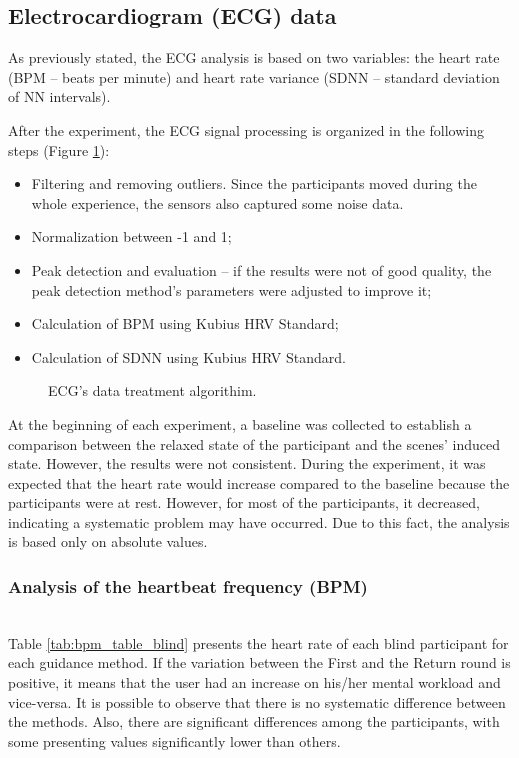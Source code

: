 \subsection*{Electrocardiogram (ECG) data}
\label{subsubsec:results_ecg_1}

As previously stated, the ECG analysis is based on two variables: the heart rate (BPM – beats per minute) and heart rate variance (SDNN – standard deviation of NN intervals). 

After the experiment, the ECG signal processing is organized in the following steps (Figure \ref{fig:ecg_algorithim}): 

\begin{itemize}
    \item Filtering and removing outliers. Since the participants moved during the whole experience, the sensors also captured some noise data.
    \item Normalization between -1 and 1;
    \item Peak detection and evaluation – if the results were not of good quality, the peak detection method's parameters were adjusted to improve it; 
    \item Calculation of BPM using Kubius HRV Standard;
    \item Calculation of SDNN using Kubius HRV Standard.
\end{itemize}

\begin{figure}[H]
    \centering
    
    \caption{ECG's data treatment algorithim.}
    \label{fig:ecg_algorithim}
\end{figure}

At the beginning of each experiment, a baseline was collected to establish a comparison between the relaxed state of the participant and the scenes' induced state. However, the results were not consistent.  During the experiment, it was expected that the heart rate would increase compared to the baseline because the participants were at rest. However, for most of the participants, it decreased, indicating a systematic problem may have occurred. Due to this fact, the analysis is based only on absolute values.

\subsubsection*{Analysis of the heartbeat frequency (BPM)}\mbox{}\\

Table \ref{tab:bpm_table_blind} presents the heart rate of each blind participant for each guidance method. If the variation between the First and the Return round is positive, it means that the user had an increase on his/her mental workload and vice-versa. It is possible to observe that there is no systematic difference between the methods. Also, there are significant differences among the participants, with some presenting values significantly lower than others.


